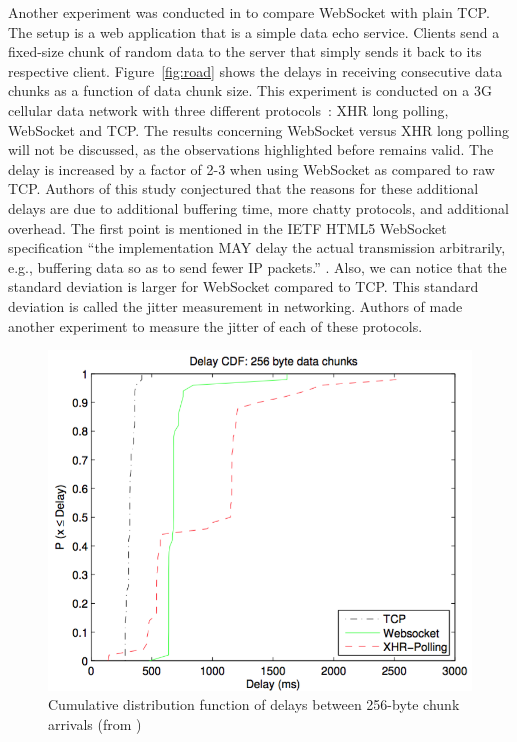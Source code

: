 \documentclass[10pt,journal,compsoc]{IEEEtran}
\newcommand{\ws}{WebSocket}
\begin{document}
Another experiment was conducted in \cite{roadblock} to compare \ws{} with plain TCP.
The setup is a web application that is a simple data echo service.
Clients send a fixed-size chunk of random data to the server that simply sends it back to its respective client.
Figure~\ref{fig:road} shows the delays in receiving consecutive data chunks as a function of data chunk size. %
This experiment is conducted on a 3G cellular data network with three different \mbox{protocols :} XHR long polling, \ws{} and TCP.
The results concerning \ws{} versus XHR long polling will not be discussed, as the observations highlighted before remains valid. %
The delay is increased by a factor of 2-3 when using \ws{} as compared to raw TCP. %
Authors of this study conjectured that the reasons for these additional delays are due to additional buffering time, more chatty protocols, and additional overhead.
The first point is mentioned in the IETF HTML5 \ws{} specification ``the implementation MAY delay the actual transmission arbitrarily, e.g., buffering data so as to send fewer IP packets.'' \cite{rfc6455}.
Also, we can notice that the standard deviation is larger for \ws{} compared to TCP.
This standard deviation is called the jitter measurement in networking.
Authors of \cite{roadblock} made another experiment to measure the jitter of each of these protocols.
\begin{figure}[!ht]
    \centering
    \includegraphics[width=\linewidth]{road_jitter.png}
    \caption{Cumulative distribution function of delays between 256-byte chunk arrivals (from \cite{roadblock})}
    \label{fig:road2}
\end{figure}
\end{document}
